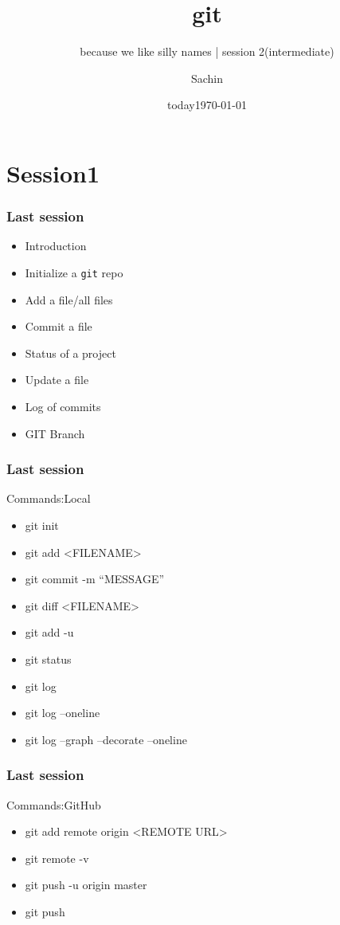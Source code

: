 \documentclass[bigger, presentation]{beamer}
\date{today}
\subtitle{because we like silly names | session 2(intermediate)}
\institute{Indian Institute of Technology Bombay}
\title{git}
\author{Sachin}
\date{\today}
\begin{document}
\maketitle

\section{Session1}
\label{sec-1}
\begin{frame}
\frametitle{Last session}
\label{sec-1-1}


\begin{itemize}
\item Introduction
\item Initialize a \texttt{git} repo
\item Add a file/all files
\item Commit a file
\item Status of a project
\item Update a file
\item Log of commits
\item GIT Branch
\end{itemize}
\end{frame}
\begin{frame}
\frametitle{Last session}
\label{sec-1-2}
\begin{block}{Commands:Local}
\label{sec-1-2-1}

\begin{itemize}
\item git init
\item git add <FILENAME>
\item git commit -m ``MESSAGE''
\item git diff <FILENAME>
\item git add -u
\item git status
\item git log
\item git log --oneline
\item git log --graph --decorate --oneline
\end{itemize}
\end{block}
\end{frame}
\begin{frame}
\frametitle{Last session}
\label{sec-1-3}
\begin{block}{Commands:GitHub}
\label{sec-1-3-1}

\begin{itemize}
\item git add remote origin <REMOTE URL>
\item git remote -v
\item git push -u origin master
\item git push
\end{itemize}
        
\end{block}
\end{frame}
\end{document}
